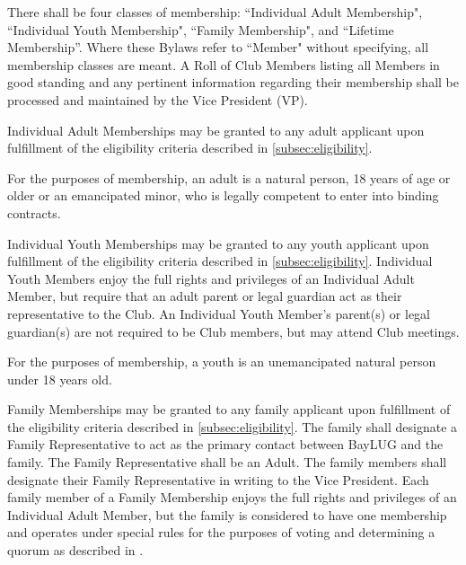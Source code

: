 \documentclass{bylaws}
\begin{document}



There shall be four classes of membership: ``Individual Adult Membership", ``Individual Youth Membership", ``Family Membership", and ``Lifetime Membership''. Where these Bylaws refer to ``Member" without specifying, all membership classes are meant. A Roll of Club Members listing all Members in good standing and any pertinent information regarding their membership shall be processed and maintained by the Vice President (VP). 


Individual Adult Memberships may be granted to any adult applicant upon fulfillment of the eligibility criteria described in \ref{subsec:eligibility}.  

For the purposes of membership, an adult is a natural person, 18 years of age or older or an emancipated minor, who is legally competent to enter into binding contracts.  

Individual Youth Memberships may be granted to any youth applicant upon fulfillment of the eligibility criteria described in \ref{subsec:eligibility}. Individual Youth Members enjoy the full rights and privileges of an Individual Adult Member, but require that an adult parent or legal guardian act as their representative to the Club. An Individual Youth Member's parent(s) or legal guardian(s) are not required to be Club members, but may attend Club meetings.

For the purposes of membership, a youth is an unemancipated natural person under 18 years old.


Family Memberships may be granted to any family applicant upon fulfillment of the eligibility criteria described in \ref{subsec:eligibility}.  The family shall designate a Family Representative to act as the primary contact between BayLUG and the family. The Family Representative shall be an Adult. The family members shall designate their Family Representative in writing to the Vice President. Each family member of a Family Membership enjoys the full rights and privileges of an Individual Adult Member, but the family is considered to have one membership and operates under special rules for the purposes of voting and determining a quorum as described in .
\end{document}
